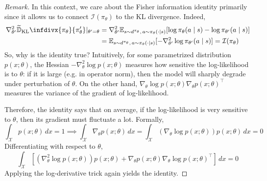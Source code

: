 \documentclass[11pt, letterpaper]{article}
\newcommand{\TKL}{\widetilde{\mathbb{D}}_{\text{KL}}\infdivx}
\newenvironment{remark}
    {\renewcommand\qedsymbol{\(\blacksquare\)}\begin{proof}[Remark]}
    {\end{proof}}
\begin{document}
\begin{remark}
    In this context, we care about the Fisher information identity primarily since it allows us to connect \(\mathcal{I}(\pi_\theta)\) to the KL divergence. Indeed, 
    \begin{align*}
        \nabla_{\theta'}^2 \TKL{\pi_\theta}{\pi_\theta'} \rvert_{\theta' = \theta}
        &= \nabla_{\theta'}^2 \mathbb{E}_{s \sim d^{\pi_\theta},\, a \sim \pi_\theta(\cdot \mid s)}[\log \pi_\theta(a \mid s) - \log \pi_{\theta'}(a \mid s)] \\
        &= \mathbb{E}_{s \sim d^{\pi_\theta},\, a \sim \pi_\theta(\cdot \mid s)}[-\nabla_{\theta'}^2 \log \pi_{\theta'}(a \mid s)]
        = \mathcal{I}(\pi_\theta)
    \end{align*}
    So, why is the identity true? Intuitively, for some parametrized distribution \(p(x; \theta)\), the Hessian \(-\nabla_\theta^2 \log p(x; \theta)\) measures how sensitive the log-likelihood is to \(\theta\): if it is large (e.g. in operator norm), then the model will sharply degrade under perturbation of \(\theta\). On the other hand, \(\nabla_\theta \log p(x; \theta) \nabla_\theta p(x; \theta)^\top\) measures the variance of the gradient of log-likelihood. 

    Therefore, the identity says that on average, if the log-likelihood is very sensitive to \(\theta\), then its gradient must fluctuate a lot. Formally,
    \[
        \int_{\mathcal{X}} p(x; \theta) \,dx = 1
        \implies 
        \int_{\mathcal{X}} \nabla_\theta p(x; \theta) \,dx
        = \int_{\mathcal{X}} (\nabla_\theta \log p(x; \theta)) p(x; \theta) \,dx 
        = 0
    \]
    Differentiating with respect to \(\theta\), 
    \[
        \int_{\mathcal{X}} [(\nabla_\theta^2 \log p(x; \theta)) p(x; \theta) + \nabla_\theta p(x; \theta) \nabla_\theta \log p(x; \theta)^\top] \,dx
        = 0
    \]
    Applying the log-derivative trick again yields the identity. 
\end{remark}
\end{document}
